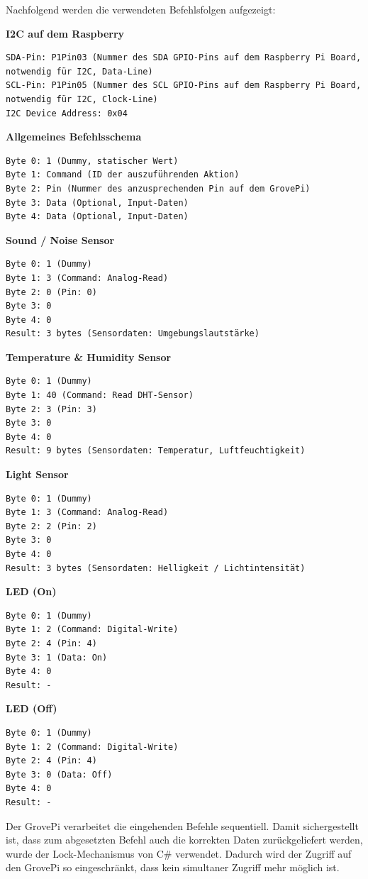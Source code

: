 Nachfolgend werden die verwendeten Befehlsfolgen aufgezeigt:

\textbf{I2C auf dem Raspberry}
\begin{lstlisting}
SDA-Pin: P1Pin03 (Nummer des SDA GPIO-Pins auf dem Raspberry Pi Board, notwendig für I2C, Data-Line)
SCL-Pin: P1Pin05 (Nummer des SCL GPIO-Pins auf dem Raspberry Pi Board, notwendig für I2C, Clock-Line)
I2C Device Address: 0x04
\end{lstlisting}

\textbf{Allgemeines Befehlsschema}
\begin{lstlisting}
Byte 0: 1 (Dummy, statischer Wert)
Byte 1: Command (ID der auszuführenden Aktion)
Byte 2: Pin (Nummer des anzusprechenden Pin auf dem GrovePi)
Byte 3: Data (Optional, Input-Daten)
Byte 4: Data (Optional, Input-Daten)
\end{lstlisting}

\textbf{Sound / Noise Sensor}
\begin{lstlisting}
Byte 0: 1 (Dummy)
Byte 1: 3 (Command: Analog-Read)
Byte 2: 0 (Pin: 0)
Byte 3: 0
Byte 4: 0
Result: 3 bytes (Sensordaten: Umgebungslautstärke)
\end{lstlisting}

\textbf{Temperature \& Humidity Sensor}
\begin{lstlisting}
Byte 0: 1 (Dummy)
Byte 1: 40 (Command: Read DHT-Sensor)
Byte 2: 3 (Pin: 3)
Byte 3: 0
Byte 4: 0
Result: 9 bytes (Sensordaten: Temperatur, Luftfeuchtigkeit)
\end{lstlisting}

\textbf{Light Sensor}
\begin{lstlisting}
Byte 0: 1 (Dummy)
Byte 1: 3 (Command: Analog-Read)
Byte 2: 2 (Pin: 2)
Byte 3: 0
Byte 4: 0
Result: 3 bytes (Sensordaten: Helligkeit / Lichtintensität)
\end{lstlisting}


\textbf{LED (On)}
\begin{lstlisting}
Byte 0: 1 (Dummy)
Byte 1: 2 (Command: Digital-Write)
Byte 2: 4 (Pin: 4)
Byte 3: 1 (Data: On)
Byte 4: 0
Result: -
\end{lstlisting}

\textbf{LED (Off)}
\begin{lstlisting}
Byte 0: 1 (Dummy)
Byte 1: 2 (Command: Digital-Write)
Byte 2: 4 (Pin: 4)
Byte 3: 0 (Data: Off)
Byte 4: 0
Result: -
\end{lstlisting}


Der GrovePi verarbeitet die eingehenden Befehle sequentiell. Damit sichergestellt ist, dass zum abgesetzten Befehl auch die korrekten Daten zurückgeliefert werden, wurde der Lock-Mechanismus von C\# verwendet. Dadurch wird der Zugriff auf den GrovePi so eingeschränkt, dass kein simultaner Zugriff mehr möglich ist.

